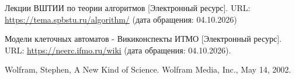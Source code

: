  \par

\begin{thebibliography}{}
     Лекции ВШТИИ по теории алгоритмов [Электронный ресурс]. URL: \href{https://tema.spbstu.ru/algorithm/}{https://tema.spbstu.ru/algorithm/} (дата обращения: 04.10.2026)

     Модели клеточных автоматов - Викиконспекты ИТМО [Электронный ресурс]. URL: \href{https://neerc.ifmo.ru/wiki/index.php?title=Модели_клеточных_автоматов}{https://neerc.ifmo.ru/wiki} (дата обращения: 04.10.2026).

     Wolfram, Stephen, A New Kind of Science. Wolfram Media, Inc., May 14, 2002.

\end{thebibliography}
\newpage
